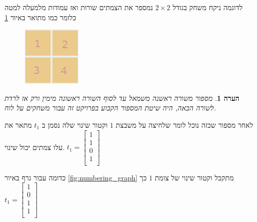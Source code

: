 \documentclass[12pt,twoside]{article}
\newtheorem{comm}{הערה}[section]
\begin{document}
לדוגמה ניקח 
משחק בגודל
$2 \times 2$
נמספר את הצמתים 
שורות ואז עמודות מלמעלה למטה כלומר כמו מתואר באיור
\ref{fig:numbering_board_2x2}

\begin{figure}[ht]
    \caption{}
    \label{fig:numbering_board_2x2}
    \unsethebrew
    \centering
    \includegraphics[width=.5\textwidth,height=.5\textheight,keepaspectratio]{images/numbering_board_2x2.PNG}
\end{figure}
\sethebrew

\begin{comm}
    \label{ comm: indexing board game}
    מספור  משורה ראשנה משמאל עד לסוף השורה ראשונה מימין ורק אז לרדת לשורה הבאה, היה
    שיטת המספור הקבוע בפרויקט זה עבור משחקים על לוח.
\end{comm}

לאחר מספור שכזה נוכל לומר שלחיצה על משבצת 
$1$
וקטור שינוי שלה נסמן ב
$t_1$
מתאר את עלו צמתים יכול שינוי.
$
    t_1 = 
    \begin{bmatrix}
        1 \\
        1 \\
        0 \\
        1 \\
    \end{bmatrix}
$

כדומה
עבור גרף באיור
\ref{fig:numbering_graph}
מתקבל וקטור שינוי של צומת 
$1$
כך
$
    t_1 = 
    \begin{bmatrix}
        1 \\
        0 \\
        1 \\
        1 \\
    \end{bmatrix}
$
\end{document}
